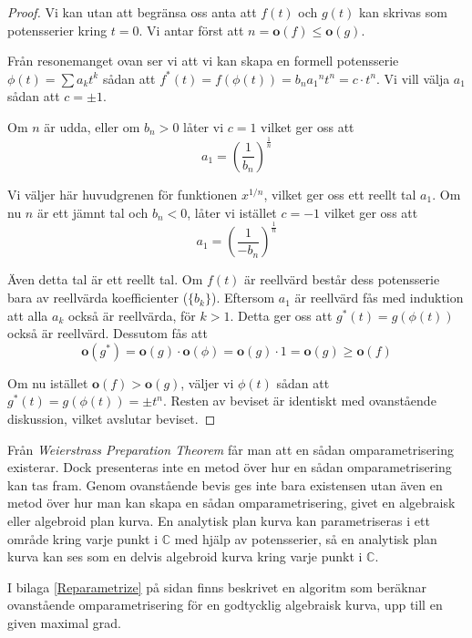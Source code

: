 \begin{proof}
Vi kan utan att begränsa oss anta att $f(t)$ och $g(t)$ kan skrivas som potensserier kring $t = 0$. Vi antar först att $n = \mathbf{o}(f) \leq \mathbf{o}(g)$.

Från resonemanget ovan ser vi att vi kan skapa en formell potensserie $\phi(t) = \sum a_k t^k$ sådan att $f^*(t) = f\left(\phi(t)\right) = b_n {a_1}^n t^n = c \cdot t^n$. Vi vill välja $a_1$ sådan att $c = \pm 1$.

Om $n$ är udda, eller om $b_n > 0$ låter vi $c = 1$ vilket ger oss att
\[a_1 = \left( \frac{1}{b_n} \right) ^ \frac{1}{n}\]

Vi väljer här huvudgrenen för funktionen $x^{1/n}$, vilket ger oss ett reellt tal $a_1$. Om nu $n$ är ett jämnt tal och $b_n < 0$, låter vi istället $c = -1$ vilket ger oss att
\[a_1 = \left( \frac{1}{-b_n} \right) ^ \frac{1}{n}\]

Även detta tal är ett reellt tal. Om $f(t)$ är reellvärd består dess potensserie bara av reellvärda koefficienter ($\{b_k\}$). Eftersom $a_1$ är reellvärd fås med induktion att alla $a_k$ också är reellvärda, för $k > 1$. Detta ger oss att $g^*(t) = g\left(\phi(t)\right)$ också är reellvärd. Dessutom fås att
\[\mathbf{o}(g^*) = \mathbf{o}(g) \cdot \mathbf{o}(\phi) = \mathbf{o}(g) \cdot 1 = \mathbf{o}(g) \geq \mathbf{o}(f)\]

Om nu istället $\mathbf{o}(f) > \mathbf{o}(g)$, väljer vi $\phi(t)$ sådan att $g^*(t) = g\left(\phi(t)\right) = \pm t^n$. Resten av beviset är identiskt med ovanstående diskussion, vilket avslutar beviset.
\end{proof}

Från \emph{Weierstrass Preparation Theorem} \cite{WeierstrassPreparationTheorem} får man att en sådan omparametrisering existerar. Dock presenteras inte en metod över hur en sådan omparametrisering kan tas fram. Genom ovanstående bevis ges inte bara existensen utan även en metod över hur man kan skapa en sådan omparametrisering, givet en algebraisk eller algebroid plan kurva. En analytisk plan kurva kan parametriseras i ett område kring varje punkt i $\mathbb{C}$ med hjälp av potensserier, så en analytisk plan kurva kan ses som en delvis algebroid kurva kring varje punkt i $\mathbb{C}$.

I bilaga \ref{Reparametrize} på sidan \pageref{Reparametrize} finns beskrivet en algoritm som beräknar ovanstående omparametrisering för en godtycklig algebraisk kurva, upp till en given maximal grad.